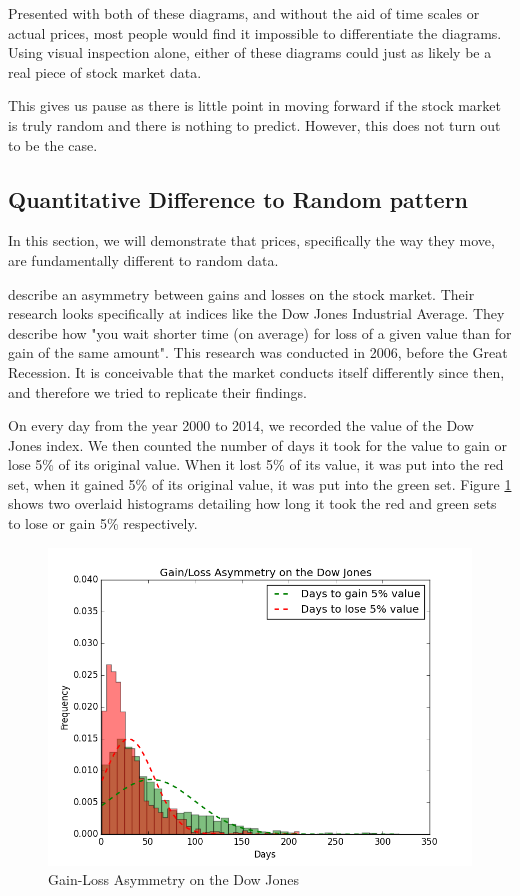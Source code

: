 \documentclass{report}
\begin{document}
Presented with both of these diagrams, and without the aid of time scales or actual prices, most people would find it impossible to differentiate the diagrams. Using visual inspection alone, either of these diagrams could just as likely be a real piece of stock market data.

This gives us pause as there is little point in moving forward if the stock market is truly random and there is nothing to predict. However, this does not turn out to be the case. 

\subsection{Quantitative Difference to Random pattern}

In this section, we will demonstrate that prices, specifically the way they move, are fundamentally different to random data.

\citet{karpio2007gain} describe an asymmetry between gains and losses on the stock market. Their research looks specifically at indices like the Dow Jones Industrial Average. They describe how "you wait shorter time (on average) for loss of a given value than for gain of the same amount". This research was conducted in 2006, before the Great Recession. It is conceivable that the market conducts itself differently since then, and therefore we tried to replicate their findings.

On every day from the year 2000 to 2014, we recorded the value of the Dow Jones index. We then counted the number of days it took for the value to gain or lose 5\% of its original value. When it lost 5\% of its value, it was put into the red set, when it gained 5\% of its original value, it was put into the green set. Figure \ref{fig:gain-loss-asymm} shows two overlaid histograms detailing how long it took the red and green sets to lose or gain 5\% respectively.

\begin{figure}[H]
	\caption{Gain-Loss Asymmetry on the Dow Jones}
	\centerline{\includegraphics[width=\textwidth]{vis/gain_loss_asymmetry.png}}
	\label{fig:gain-loss-asymm}
\end{figure}
\end{document}

